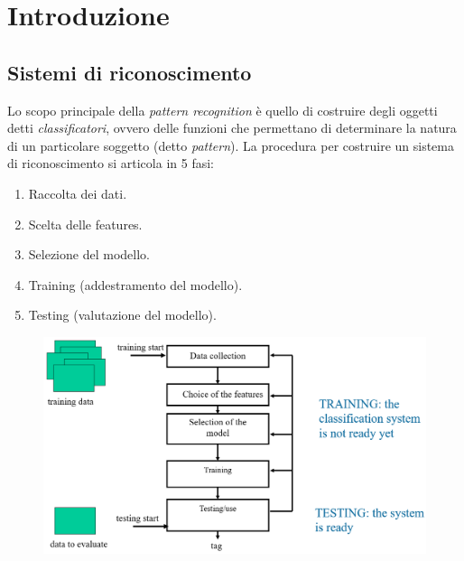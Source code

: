 \documentclass[a4paper,oneside,titlepage]{book}
\begin{document}
\begin{frontespizio}
\end{frontespizio}

\frontmatter
{
  \hypersetup{linkcolor=black}
  \tableofcontents
}

\mainmatter
\chapter{Introduzione}

\section{Sistemi di riconoscimento}
Lo scopo principale della \textit{pattern recognition} è quello di costruire degli oggetti detti \textit{classificatori}, ovvero delle funzioni che permettano di determinare la natura di un particolare soggetto (detto \textit{pattern}). La procedura per costruire un sistema di riconoscimento si articola in 5 fasi:
\begin{enumerate}
    \item Raccolta dei dati.
    \item Scelta delle features.
    \item Selezione del modello.
    \item Training (addestramento del modello).
    \item Testing (valutazione del modello).
\end{enumerate}
\begin{figure}[htp]
	\centering
	\includegraphics[width=\textwidth, height=\textheight, keepaspectratio]{pr-scheme.png}
\end{figure}
\end{document}
